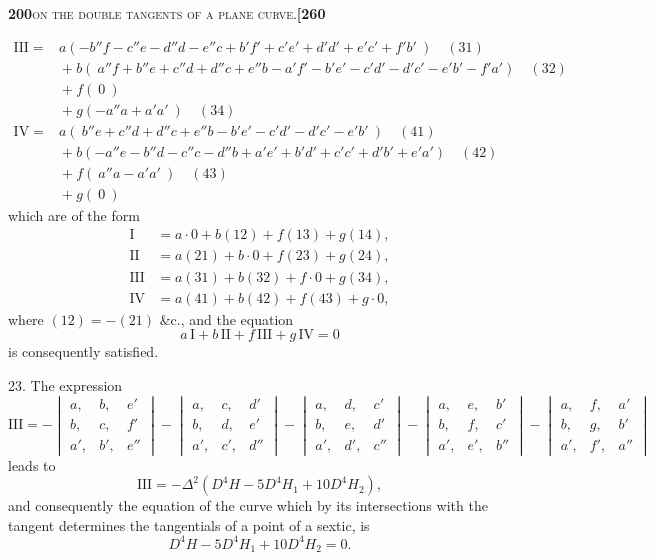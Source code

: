 \documentclass[11pt]{article}
\begin{document}
\newpage

\noindent\textbf{200}\hfill\textsc{on the double tangents of a plane curve.}\hfill\textbf{[260}

\medskip

\[
\begin{array}{rl}
\mathrm{III} = & a(-b''f - c''e - d''d - e''c + b'f' + c'e' + d'd' + e'c' + f'b'\ )\quad (31)\\
& {} + b(\ a''f + b''e + c''d + d''c + e''b - a'f' - b'e' - c'd' - d'c' - e'b' - f'a')\quad (32)\\
& {} + f(\ 0\ )\\
& {} + g(-a''a + a'a'\ )\quad (34)\\[4pt]
\mathrm{IV} = & a(\ b''e + c''d + d''c + e''b - b'e' - c'd' - d'c' - e'b'\ )\quad (41)\\
& {} + b(-a''e - b''d - c''c - d''b + a'e' + b'd' + c'c' + d'b' + e'a')\quad (42)\\
& {} + f(\ a''a - a'a'\ )\quad (43)\\
& {} + g(\ 0\ )
\end{array}
\]
which are of the form
\[
\begin{aligned}
\mathrm{I} &= a\cdot 0 + b(12) + f(13) + g(14),\\
\mathrm{II} &= a(21) + b\cdot 0 + f(23) + g(24),\\
\mathrm{III} &= a(31) + b(32) + f\cdot 0 + g(34),\\
\mathrm{IV} &= a(41) + b(42) + f(43) + g\cdot 0,
\end{aligned}
\]
where $(12) = -(21)$ \&c., and the equation
\[
a\,\mathrm{I} + b\,\mathrm{II} + f\,\mathrm{III} + g\,\mathrm{IV} = 0
\]
is consequently satisfied.

\medskip

23. The expression
\[
\mathrm{III} = -\begin{vmatrix} a, & b, & e'\\ b, & c, & f'\\ a', & b', & e'' \end{vmatrix} - \begin{vmatrix} a, & c, & d'\\ b, & d, & e'\\ a', & c', & d'' \end{vmatrix} - \begin{vmatrix} a, & d, & c'\\ b, & e, & d'\\ a', & d', & c'' \end{vmatrix} - \begin{vmatrix} a, & e, & b'\\ b, & f, & c'\\ a', & e', & b'' \end{vmatrix} - \begin{vmatrix} a, & f, & a'\\ b, & g, & b'\\ a', & f', & a'' \end{vmatrix}
\]
leads to
\[
\mathrm{III} = -\Delta^2(D^4 H - 5D^4 H_1 + 10D^4 H_2),
\]
and consequently the equation of the curve which by its intersections with the tangent determines the tangentials of a point of a sextic, is
\[
D^4 H - 5D^4 H_1 + 10D^4 H_2 = 0.
\]
\end{document}
